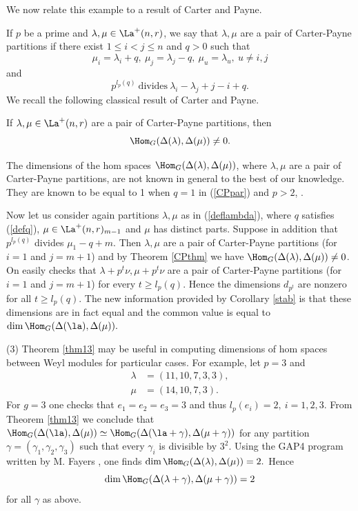 \begin{exams}
	We now relate this example to a result of Carter and Payne.
	
	If $p$ be a prime and $\lambda, \mu \in \La^+(n,r)$, we say that $\lambda, \mu$ are a pair of Carter-Payne partitions if there exist $1 \le i<j \le n$ and $q>0$ such that \begin{equation}\label{CPpar}\mu_i=\lambda_i +q, \ \mu_j=\lambda_j -q, \ \mu_u=\lambda_u, \ u \neq i,j \end{equation}
	and \begin{equation}\label{CPdiv} p^{l_p(q)} \ \textrm{divides} \ \lambda_i-\lambda_j +j-i+q.
	\end{equation}
	We recall the following classical result of Carter and Payne.
	\begin{theo}[{\cite{CP}}]\label{CPthm}
If $\lambda, \mu \in \La^+(n,r)$ are a pair of Carter-Payne partitions, then \[\Hom_G(\Delta(\lambda), \Delta(\mu)) \neq 0.\]
	\end{theo}
	The dimensions of the hom spaces $\Hom_G(\Delta(\lambda), \Delta(\mu))$, where $\lambda, \mu$ are a pair of Carter-Payne partitions, are not known in general to the best of our knowledge. They are known to be equal to 1 when $q=1$ in (\ref{CPpar}) and $p>2$, \cite{EM}.
	
	Now let us consider again partitions $\lambda,  \mu $ as  in (\ref{deflambda}), where $q$ satisfies (\ref{defq}), $\mu \in \La^+(n,r)_{m-1}$ and $\mu$ has distinct parts. Suppose in addition that $p^{l_p(q)}$ divides $\mu_1-q+m$. Then $\lambda, \mu$ are a pair of Carter-Payne partitions (for $i=1$ and $j=m+1$) and by Theorem \ref{CPthm} we have $\Hom_G(\Delta(\lambda), \Delta(\mu)) \neq 0$. On easily checks that $\lambda +p^t\nu, \mu +p^t\nu$ are a pair of Carter-Payne partitions (for $i=1$ and $j=m+1$) for every $t \ge l_p(q)$. Hence the dimensions $d_{p^t}$ are nonzero for all $ t \ge l_p(q)$. The new information provided by Corollary \ref{stab} is that these dimensions are in fact equal and the common value is equal to $\dim \Hom_G(\Delta(\la),\Delta(\mu)).$
	
	(3) Theorem \ref{thm13} may be useful in computing dimensions of hom spaces between Weyl modules for particular cases. For example, let $p=3$ and \begin{align*}\lambda&=(11, 10, 7, 3, 3), \\ \mu &=(14, 10, 7, 3). \end{align*} For $g=3$ one checks that  $e_1=e_2=e_3=3$ and thus $l_p(e_i)=2, \ i=1,2,3$. From Theorem \ref{thm13} we conclude that $\Hom_G(\Delta(\la),\Delta(\mu)) \simeq \Hom_{G}(\Delta(\la+\gamma), \Delta(\mu+\gamma))$ for any partition $\gamma = (\gamma_1, \gamma_2, \gamma_3)$ such that every $\gamma_i$ is divisible by $3^2$. Using the GAP4 program written by M. Fayers \cite{FGAP}, one finds $\dim\Hom_G(\Delta(\lambda), \Delta(\mu))=2.$ Hence \[\dim\Hom_G(\Delta(\lambda +\gamma), \Delta(\mu + \gamma))=2\] for all  $\gamma$ as above.


\end{exams}
